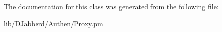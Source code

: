 \-The documentation for this class was generated from the following file\-:\begin{DoxyCompactItemize}
\item 
lib/\-D\-Jabberd/\-Authen/\hyperlink{_authen_2_proxy_8pm}{\-Proxy.\-pm}\end{DoxyCompactItemize}
